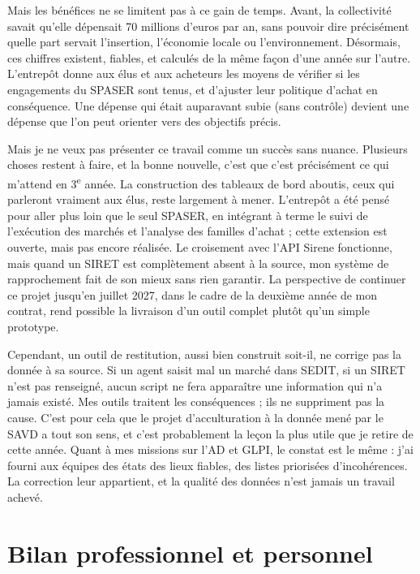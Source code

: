 \documentclass[11pt,a4paper]{article}
\begin{document}
Mais les bénéfices ne se limitent pas à ce gain de temps. Avant, la collectivité savait qu'elle dépensait 70 millions d'euros par an, sans pouvoir dire précisément quelle part servait l'insertion, l'économie locale ou l'environnement. Désormais, ces chiffres existent, fiables, et calculés de la même façon d'une année sur l'autre. L'entrepôt donne aux élus et aux acheteurs les moyens de vérifier si les engagements du SPASER sont tenus, et d'ajuster leur politique d'achat en conséquence. Une dépense qui était auparavant subie (sans contrôle) devient une dépense que l'on peut orienter vers des objectifs précis.

Mais je ne veux pas présenter ce travail comme un succès sans nuance. Plusieurs choses restent à faire, et la bonne nouvelle, c'est que c'est précisément ce qui m'attend en 3\textsuperscript{e} année. La construction des tableaux de bord aboutis, ceux qui parleront vraiment aux élus, reste largement à mener. L'entrepôt a été pensé pour aller plus loin que le seul SPASER, en intégrant à terme le suivi de l'exécution des marchés et l'analyse des familles d'achat ; cette extension est ouverte, mais pas encore réalisée. Le croisement avec l'API Sirene fonctionne, mais quand un SIRET est complètement absent à la source, mon système de rapprochement fait de son mieux sans rien garantir. La perspective de continuer ce projet jusqu'en juillet 2027, dans le cadre de la deuxième année de mon contrat, rend possible la livraison d'un outil complet plutôt qu'un simple prototype.

Cependant, un outil de restitution, aussi bien construit soit-il, ne corrige pas la donnée à sa source. Si un agent saisit mal un marché dans SEDIT, si un SIRET n'est pas renseigné, aucun script ne fera apparaître une information qui n'a jamais existé. Mes outils traitent les conséquences ; ils ne suppriment pas la cause. C'est pour cela que le projet d'acculturation à la donnée mené par le SAVD a tout son sens, et c'est probablement la leçon la plus utile que je retire de cette année. Quant à mes missions sur l'AD et GLPI, le constat est le même : j'ai fourni aux équipes des états des lieux fiables, des listes priorisées d'incohérences. La correction leur appartient, et la qualité des données n'est jamais un travail achevé.

\section*{Bilan professionnel et personnel}
\end{document}
